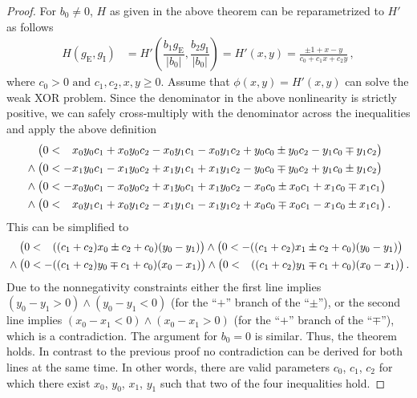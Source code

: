 \begin{proof}
For $b_0 \neq 0$, $H$ as given in the above theorem can be reparametrized to $H'$ as follows
\begin{align*} 
	H(g_\mathrm{E}, g_\mathrm{I}) &= H'\left( \dfrac{b_1  g_\mathrm{E}}{| b_0 |}, \dfrac{b_2 g_\mathrm{I}}{| b_0 |} \right) = H'(x, y) = \frac{\pm 1 + x - y}{c_0 + c_1 x + c_2 y} \,,
\end{align*}
where $c_0 > 0 \text{ and } c_1, c_2, x, y \geq 0$.
Assume that $\phi(x, y) = H'(x, y)$ can solve the weak XOR problem. Since the denominator in the above nonlinearity is strictly positive, we can safely cross-multiply with the denominator across the inequalities and apply the above definition
\begin{align*}
		&\hphantom{\wedge}\;\,  \bigl( 0 < \hphantom{-}  x_0 y_0 c_1 + x_0 y_0 c_2 - x_0 y_1 c_1 - x_0 y_1 c_2 + y_0 c_0 \pm y_0 c_2 - y_1 c_0 \mp y_1 c_2 \bigr) \\
		&\wedge  \bigl( 0 <           -   x_1 y_0 c_1 - x_1 y_0 c_2 + x_1 y_1 c_1 + x_1 y_1 c_2 - y_0 c_0 \mp y_0 c_2 + y_1 c_0 \pm y_1 c_2 \bigr) \\
		&\wedge  \bigl( 0 <           -   x_0 y_0 c_1 - x_0 y_0 c_2 + x_1 y_0 c_1 + x_1 y_0 c_2 - x_0 c_0 \pm x_0 c_1 + x_1 c_0 \mp x_1 c_1 \bigr) \\
		&\wedge  \bigl( 0 < \hphantom{-}  x_0 y_1 c_1 + x_0 y_1 c_2 - x_1 y_1 c_1 - x_1 y_1 c_2 + x_0 c_0 \mp x_0 c_1 - x_1 c_0 \pm x_1 c_1 \bigr) \,.
\end{align*}
This can be simplified to
\begin{align*}
		&\hphantom{\wedge}\;\, \bigl( 0 < \hphantom{-} ((c_1 + c_2) x_0 \pm c_2 + c_0) (y_0 - y_1) \bigr)
		 \wedge  \bigl( 0 <           -  ((c_1 + c_2) x_1 \pm c_2 + c_0) (y_0 - y_1) \bigr) \\
		&\wedge  \bigl( 0 <           -  ((c_1 + c_2) y_0 \mp c_1 + c_0) (x_0 - x_1) \bigr)
		 \wedge  \bigl( 0 < \hphantom{-} ((c_1 + c_2) y_1 \mp c_1 + c_0) (x_0 - x_1) \bigr) \,.
\end{align*}
Due to  the nonnegativity constraints either the first line implies $(y_0 - y_1 > 0) \wedge (y_0 - y_1 < 0)$ (for the \enquote{$+$} branch of the \enquote{$\pm$}), or the second line implies $(x_0 - x_1 < 0) \wedge (x_0 - x_1 > 0)$ (for the \enquote{$+$} branch of the \enquote{$\mp$}), which is a contradiction. The argument for $b_0 = 0$ is similar. Thus, the theorem holds. In contrast to the previous proof no contradiction can be derived for both lines at the same time. In other words, there are valid parameters $c_0$, $c_1$, $c_2$ for which there exist $x_0$, $y_0$, $x_1$, $y_1$ such that two of the four inequalities hold.
\end{proof}
